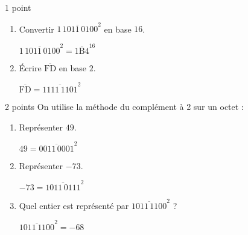 \documentclass[a4paper,dvipsnames]{article}
\begin{document}
\medskip

\begin{exercice}{1 point}{}
 \begin{enumerate}
   \item Convertir $\overline{1\,1011\,0100}^2$ en base $16$.

     \begin{correction}
       $\overline{1\,1011\,0100}^2=\overline{1\text{B}4}^{16}$
     \end{correction}
     
   \item Écrire $\overline{\text{F}\text{D}}$ en base $2$.

     \begin{correction}
       $\overline{\text{F}\text{D}}=\overline{1111\,1101}^2$
     \end{correction}
     
 \end{enumerate} 
\end{exercice}

\medskip

\begin{exercice}{2 points}{}
 On utilise la méthode du complément à 2 sur un octet :
 \begin{enumerate}
   \item Représenter $49$.

     \begin{correction}
       $49=\overline{0011\,0001}^2$
     \end{correction}
     
   \item Représenter $-73$. 

     \begin{correction}
       $-73=\overline{1011\,0111}^2$ 
     \end{correction}
     
   \item Quel entier est représenté par $\overline{1011\,1100}^2$ ?

     \begin{correction}
       $\overline{1011\,1100}^2=-68$
     \end{correction}
     
 \end{enumerate}
\end{exercice}
\end{document}

